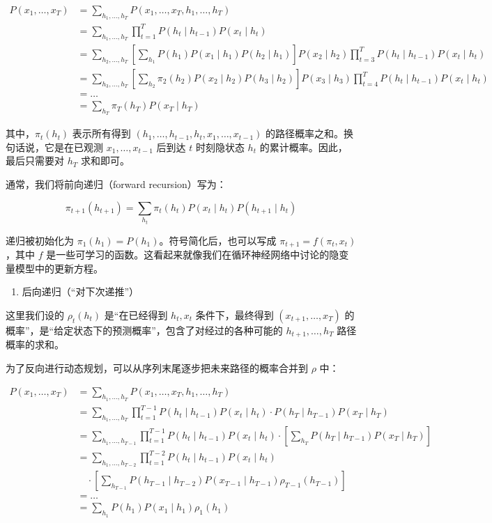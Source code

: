 \[
\begin{aligned}
P(x_1, \ldots, x_T)
&= \sum_{h_1,\ldots,h_T} P(x_1, \ldots, x_T, h_1, \ldots, h_T) \\
&= \sum_{h_1,\ldots,h_T} \prod_{t=1}^{T} P(h_t \mid h_{t-1})P(x_t \mid h_t) \\
&= \sum_{h_2,\ldots,h_T}\left[\sum_{h_1}P(h_1)P(x_1 \mid h_1)P(h_2 \mid h_1)\right]P(x_2 \mid h_2)\prod_{t=3}^{T}P(h_t \mid h_{t-1})P(x_t \mid h_t) \\
&= \sum_{h_3,\ldots,h_T}\left[\sum_{h_2}\pi_2(h_2)P(x_2 \mid h_2)P(h_3 \mid h_2)\right]P(x_3 \mid h_3)\prod_{t=4}^{T}P(h_t \mid h_{t-1})P(x_t \mid h_t) \\
&= \ldots \\
&= \sum_{h_T}\pi_T(h_T)P(x_T \mid h_T)
\end{aligned}
\]

其中，\(\pi_t(h_t)\) 表示所有得到 \((h_1, \ldots, h_{t-1}, h_t, x_1, \ldots, x_{t-1})\) 的路径概率之和。换句话说，它是在已观测 \(x_1, \ldots, x_{t-1}\) 后到达 \(t\) 时刻隐状态 \(h_t\) 的累计概率。因此，最后只需要对 \(h_T\) 求和即可。

通常，我们将前向递归（forward recursion）写为：

\[
\pi_{t+1}(h_{t+1}) = \sum_{h_t}\pi_t(h_t)P(x_t \mid h_t)P(h_{t+1} \mid h_t)
\]

递归被初始化为 \(\pi_1(h_1) = P(h_1)\)。符号简化后，也可以写成 \(\pi_{t+1} = f(\pi_t, x_t)\)，其中 \(f\) 是一些可学习的函数。这看起来就像我们在循环神经网络中讨论的隐变量模型中的更新方程。

\begin{enumerate}
\def\labelenumi{\arabic{enumi}.}
\setcounter{enumi}{1}
\tightlist
\item
  后向递归（``对下次递推''）
\end{enumerate}

这里我们设的 \(\rho_t(h_t)\) 是``在已经得到 \(h_t, x_t\) 条件下，最终得到 \((x_{t+1}, \ldots, x_T)\) 的概率''，是``给定状态下的预测概率''，包含了对经过的各种可能的 \(h_{t+1}, \ldots, h_T\) 路径概率的求和。

为了反向进行动态规划，可以从序列末尾逐步把未来路径的概率合并到 \(\rho\) 中：

\[
\begin{aligned}
P(x_1, \ldots, x_T)
&= \sum_{h_1,\ldots,h_T} P(x_1, \ldots, x_T, h_1, \ldots, h_T) \\
&= \sum_{h_1,\ldots,h_T}\prod_{t=1}^{T-1}P(h_t \mid h_{t-1})P(x_t \mid h_t)\cdot P(h_T \mid h_{T-1})P(x_T \mid h_T) \\
&= \sum_{h_1,\ldots,h_{T-1}}\prod_{t=1}^{T-1}P(h_t \mid h_{t-1})P(x_t \mid h_t)\cdot \left[\sum_{h_T}P(h_T \mid h_{T-1})P(x_T \mid h_T)\right] \\
&= \sum_{h_1,\ldots,h_{T-2}}\prod_{t=1}^{T-2}P(h_t \mid h_{t-1})P(x_t \mid h_t) \\
&\quad {}\cdot \left[\sum_{h_{T-1}}P(h_{T-1} \mid h_{T-2})P(x_{T-1} \mid h_{T-1})\rho_{T-1}(h_{T-1})\right] \\
&= \ldots \\
&= \sum_{h_1}P(h_1)P(x_1 \mid h_1)\rho_1(h_1)
\end{aligned}
\]

